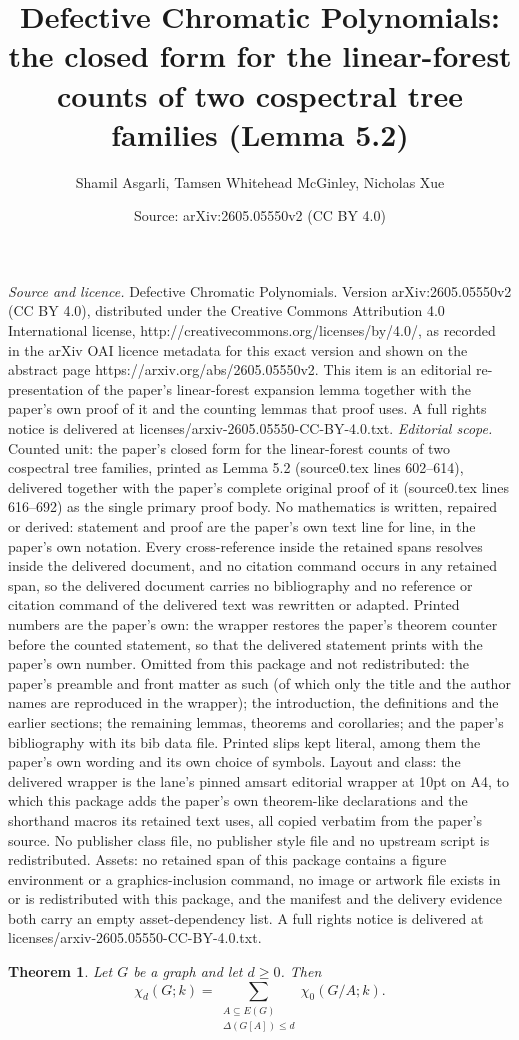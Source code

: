 \documentclass[10pt,a4paper]{amsart}
\title[Defective chromatic polynomials]{Defective Chromatic Polynomials: the closed form for the linear-forest counts of two cospectral tree families (Lemma 5.2)}
\author[S. Asgarli, T. W. McGinley, N. Xue]{Shamil Asgarli, Tamsen Whitehead McGinley, Nicholas Xue}
\date{Source: arXiv:2605.05550v2 (CC BY 4.0)}
\newtheorem{thm}{Theorem}[section]
\theoremstyle{definition}
\begin{document}
\maketitle
\vspace{1em}
\noindent\textit{Source and licence.} Defective Chromatic Polynomials. Version arXiv:2605.05550v2 (CC BY 4.0), distributed under the Creative Commons Attribution 4.0 International license, http://creativecommons.org/licenses/by/4.0/, as recorded in the arXiv OAI licence metadata for this exact version and shown on the abstract page https://arxiv.org/abs/2605.05550v2. This item is an editorial re-presentation of the paper's linear-forest expansion lemma together with the paper's own proof of it and the counting lemmas that proof uses. A full rights notice is delivered at licenses/arxiv-2605.05550-CC-BY-4.0.txt.
\noindent\textit{Editorial scope.} Counted unit: the paper's closed form for the linear-forest counts of two cospectral tree families, printed as Lemma 5.2 (source0.tex lines 602--614), delivered together with the paper's complete original proof of it (source0.tex lines 616--692) as the single primary proof body. No mathematics is written, repaired or derived: statement and proof are the paper's own text line for line, in the paper's own notation. Every cross-reference inside the retained spans resolves inside the delivered document, and no citation command occurs in any retained span, so the delivered document carries no bibliography and no reference or citation command of the delivered text was rewritten or adapted. Printed numbers are the paper's own: the wrapper restores the paper's theorem counter before the counted statement, so that the delivered statement prints with the paper's own number. Omitted from this package and not redistributed: the paper's preamble and front matter as such (of which only the title and the author names are reproduced in the wrapper); the introduction, the definitions and the earlier sections; the remaining lemmas, theorems and corollaries; and the paper's bibliography with its bib data file. Printed slips kept literal, among them the paper's own wording and its own choice of symbols. Layout and class: the delivered wrapper is the lane's pinned amsart editorial wrapper at 10pt on A4, to which this package adds the paper's own theorem-like declarations and the shorthand macros its retained text uses, all copied verbatim from the paper's source. No publisher class file, no publisher style file and no upstream script is redistributed. Assets: no retained span of this package contains a figure environment or a graphics-inclusion command, no image or artwork file exists in or is redistributed with this package, and the manifest and the delivery evidence both carry an empty asset-dependency list. A full rights notice is delivered at licenses/arxiv-2605.05550-CC-BY-4.0.txt.
\setcounter{section}{2}
\setcounter{thm}{0}
\begin{thm}\label{thm:general-contraction}
Let $G$ be a graph and let $d\geq 0$. Then
\[
\chi_d(G;k)=\sum_{\substack{A\subseteq E(G)\\ \Delta(G[A])\leq d}} \chi_0(G/A;k).
\]
\end{thm}
\end{document}
